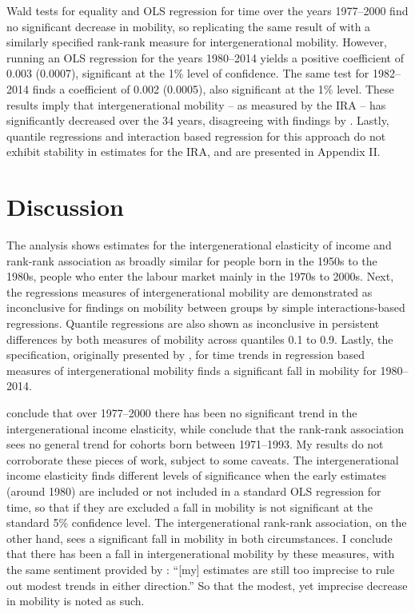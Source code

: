 \documentclass[notitlepage,12pt]{article}
\begin{document}
Wald tests for equality and OLS regression for time over the years 1977--2000 find no significant decrease in mobility, so replicating the same result of \cite{lee2009trends} with a similarly specified rank-rank measure for intergenerational mobility.  However, running an OLS regression for the years 1980--2014 yields a positive coefficient of 0.003 (0.0007), significant at the 1\% level of confidence.  The same test for 1982--2014 finds a coefficient of 0.002 (0.0005), also significant at the 1\% level.  These results imply that intergenerational mobility – as measured by the IRA – has significantly decreased over the 34 years, disagreeing with findings by \cite{chetty2014united}.  Lastly, quantile regressions and interaction based regression for this approach do not exhibit stability in estimates for the IRA, and are presented in Appendix II.

\section{Discussion}
The analysis shows estimates for the intergenerational elasticity of income and rank-rank association as broadly similar for people born in the 1950s to the 1980s, people who enter the labour market mainly in the 1970s to 2000s.  Next, the regressions measures of intergenerational mobility are demonstrated as inconclusive for findings on mobility between groups by simple interactions-based regressions.  Quantile regressions are also shown as inconclusive in persistent differences by both measures of mobility across quantiles 0.1 to 0.9.  Lastly, the specification, originally presented by \cite{lee2009trends}, for time trends in regression based measures of intergenerational mobility finds a significant fall in mobility for 1980--2014.  

\cite{lee2009trends} conclude that over 1977--2000 there has been no significant trend in the intergenerational income elasticity, while \cite{chetty2014united} conclude that the rank-rank association sees no general trend for cohorts born between 1971--1993.  My results do not corroborate these pieces of work, subject to some caveats.  The intergenerational income elasticity finds different levels of significance when the early estimates (around 1980) are included or not included in a standard OLS regression for time, so that if they are excluded a fall in mobility is not significant at the standard 5\% confidence level.  The intergenerational rank-rank association, on the other hand, sees a significant fall in mobility in both circumstances.  I conclude that there has been a fall in intergenerational mobility by these measures, with the same sentiment provided by \cite{lee2009trends}: ``[my] estimates are still too imprecise to rule out modest trends in either direction.''  So that the modest, yet imprecise decrease in mobility is noted as such.
\end{document}
